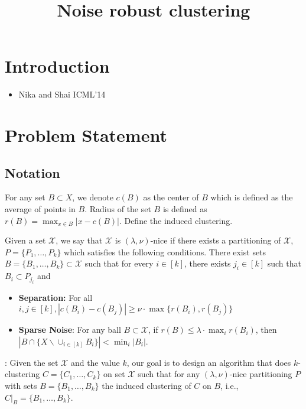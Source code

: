\documentclass[11pt]{article}
\title{\LARGE Noise robust clustering}
\author{}
\begin{document}
\maketitle

\section{Introduction}
\begin{itemize}
\item Nika and Shai ICML'14
\end{itemize}

\section{Problem Statement}

\subsection{Notation}
For any set $B\subset X$, we denote $c(B)$ as the center of $B$ which is defined as the average of points in $B$. Radius of the set $B$ is defined as $r(B)=\max_{x\in B} |x-c(B)|$. Define the induced clustering.

\begin{definition}
Given a set $\mathcal{X}$, we say that $\mathcal{X}$ is $(\lambda,\nu)$-nice if there exists a partitioning of $\mathcal{X}$, $P=\{P_1,\ldots,P_k\}$ which satisfies the following conditions. There exist sets $B=\{B_1,\ldots,B_k\}\subset \mathcal{X}$ such that for every $i\in[k]$, there exists $j_i\in[k]$ such that $B_i\subset P_{j_i}$ and
\begin{itemize}
\item{\bf{Separation}:} For all $i,j\in[k], |c(B_i)-c(B_j)|\geq \nu\cdot\max\{r(B_i),r(B_j)\}$
\item{\bf{Sparse Noise}}: For any ball $B\subset \mathcal{X}$, if $r(B)\leq \lambda \cdot \max_i r(B_i)$, then $|B\cap \{X \backslash \cup_{i\in[k]} B_i\}| < \min_i |B_i|$.
\end{itemize}
\end{definition}


: Given the set $\mathcal{X}$ and the value $k$, our goal is to design an algorithm that does $k$-clustering $C=\{C_1,\ldots,C_k\}$ on set $\mathcal{X}$ such that  for any $(\lambda,\nu)$-nice partitioning $P$ with sets $B = \{B_1,\ldots,B_k\}$ the induced clustering of $C$ on $B$, i.e., $C|_B = \{B_1,\ldots,B_k\}$. 
\end{document}
